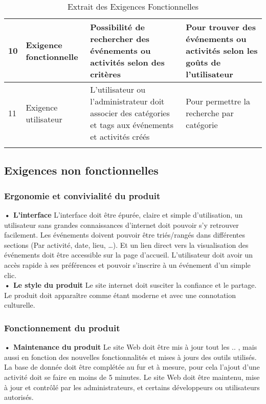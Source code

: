 {\begin{longtable}{|p{0.5cm}|p{2cm}|p{6cm}|p{6cm}|}
10 & Exigence fonctionnelle & Possibilité de rechercher des événements ou activités selon des critères & Pour trouver des événements ou activités selon les goûts de l'utilisateur\\\hline %

11 & Exigence utilisateur & L'utilisateur ou l'administrateur doit associer des catégories et tags aux événements et activités créés & Pour permettre la recherche par catégorie\\\hline %

\caption{Extrait des Exigences Fonctionnelles}
\end{longtable} 
}

\subsection{Exigences non fonctionnelles}

\subsubsection{Ergonomie et convivialité du produit}

\textbf{• L’interface}
L’interface doit être épurée, claire et simple d’utilisation, un utilisateur sans grandes connaissances d’internet doit pouvoir s’y retrouver facilement. Les événements doivent pouvoir être triés/rangés dans différentes sections (Par activité, date, lieu, …). Et un lien direct vers la visualisation des événements doit être accessible sur la page d’accueil.
L’utilisateur doit avoir un accès rapide à ses préférences et pouvoir s’inscrire à un événement d’un simple clic. \\

\textbf{• Le style du produit}
Le site internet doit susciter la confiance et le partage. Le produit doit apparaître comme étant moderne et avec une connotation culturelle.

\subsubsection{Fonctionnement du produit}

\textbf{• Maintenance du produit}
Le site Web doit être mis à jour tout les .. , mais aussi en fonction des nouvelles fonctionnalités et mises à jours des outils utilisés. 
La base de donnée doit être complétée au fur et à mesure, pour cela l’ajout d’une activité doit se faire en moins de 5 minutes. 
Le site Web doit être maintenu, mise à jour et contrôlé par les administrateurs, et certains développeurs ou utilisateurs autorisés.

